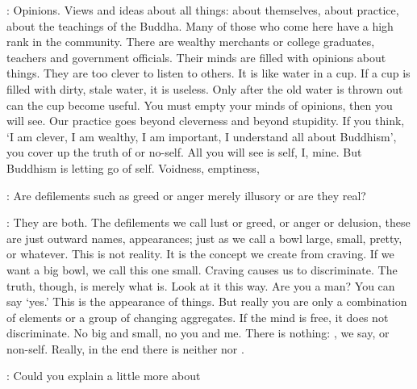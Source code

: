 : Opinions. Views and ideas about all things: about themselves, about practice, about the teachings of the Buddha. Many of those who come here have a high rank in the community. There are wealthy merchants or college graduates, teachers and government officials. Their minds are filled with opinions about things. They are too clever to listen to others. It is like water in a cup. If a cup is filled with dirty, stale water, it is useless. Only after the old water is thrown out can the cup become useful. You must empty your minds of opinions, then you will see. Our practice goes beyond cleverness and beyond stupidity. If you think, `I am clever, I am wealthy, I am important, I understand all about Buddhism', you cover up the truth of  or no-self. All you will see is self, I, mine. But Buddhism is letting go of self. Voidness, emptiness,  

:
Are defilements such as greed or anger merely illusory or are they real? 

: They are both. The defilements we call lust or greed, or anger or delusion, these are just outward names, appearances; just as we call a bowl large, small, pretty, or whatever. This is not reality. It is the concept we create from craving. If we want a big bowl, we call this one small. Craving causes us to discriminate. The truth, though, is merely what is. Look at it this way. Are you a man? You can say `yes.' This is the appearance of things. But really you are only a combination of elements or a group of changing aggregates. If the mind is free, it does not discriminate. No big and small, no you and me. There is nothing: , we say, or non-self. Really, in the end there is neither  nor . 

:
Could you explain a little more about 

